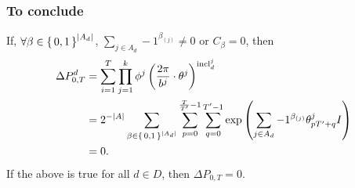 \subsubsection*{To conclude}
If, $\forall \beta \in \set{0, 1}^{|A_d|}$, $\sum_{j \in A_d} -1 ^ {\beta_{(j)}} \neq 0$
or $C_\beta = 0$, then
\begin{align*}
  \Delta P_{0, T}^d &= \sum_{i = 1}^T \prod_{j=1}^k \phi^j\left(\frac{2\pi}{b^j} \cdot \theta^j\right) ^ {{\mathrm{incl}_{d}^{j}}} \\&=  2^{-|A|}
  \sum_{\beta \in \set{0,1}^{|A_d|}} 
      \sum_{p= 0}^{\frac{T}{{T}'} - 1} \sum_{q = 0}^{{T}' - 1}
     \exp\left(
         \sum_{j \in A_d} -1 ^ {\beta_{(j)}}
         {\theta^j_{p {T}' + q}}I
       \right) \\
        &= 0.
\end{align*}
If the above is true for all $d \in D$, then 
$\Delta P_{0, T} = 0$.
